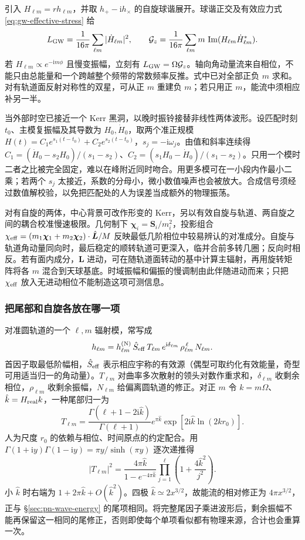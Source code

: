 引入 $H_{\ell m}=r h_{\ell m}$，并取 $h_+-\mathrm i h_\times$ 的自旋球谐展开。球谐正交及有效应力式 \eqref{eq:gw-effective-stress} 给
\begin{equation}
 L_{\rm GW}=\frac{1}{16\pi}\sum_{\ell m}|\dot H_{\ell m}|^2,\qquad
 {\cal G}_z=\frac{1}{16\pi}\sum_{\ell m}m\,
                   \operatorname{Im}(H_{\ell m}\dot H_{\ell m}^*) .
 \label{eq:gw-cmodes}
\end{equation}
若 $H_{\ell m}\propto e^{-\mathrm i m\phi}$ 且慢变振幅，立刻有 $L_{\rm GW}=\Omega{\cal G}_z$。轴向角动量流来自相位，不能只由总能量和一个跨越整个频带的常数频率反推。式中已对全部正负 $m$ 求和。对有轨道面反射对称性的双星，可从正 $m$ 重建负 $m$；若只用正 $m$，能流中须相应补另一半。

当外部时空已接近一个 Kerr 黑洞，以晚时振铃接替非线性两体波形。设匹配时刻 $t_0$、主模复振幅及其导数为 $H_0,\dot H_0$，取两个准正规模 $H(t)=C_1 e^{s_1(t-t_0)}+C_2 e^{s_2(t-t_0)}$，$s_j=-\mathrm i\omega_j$。由值和斜率连续得 $C_1=(\dot H_0-s_2H_0)/(s_1-s_2)$、$C_2=(s_1H_0-\dot H_0)/(s_1-s_2)$。只用一个模时二者之比被完全固定，难以在峰附近同时吻合。用更多模可在一小段内作最小二乘；若两个 $s_j$ 太接近，系数的分母小，微小数值噪声也会被放大。合成信号须经过数值解校验，以免把匹配处的人为误差当成额外的物理振荡。

对有自旋的两体，中心背景可改作形变的 Kerr，另以有效自旋与轨道、两自旋之间的耦合校准慢速极限。几何制下 $\bm\chi_i=\bm S_i/m_i^2$，投影组合 $\chi_{\rm eff}=(m_1\bm\chi_1+m_2\bm\chi_2)\cdot\hat{\bm L}/M$ 反映最低几阶相位中较易辨认的对准成分。自旋与轨道角动量同向时，最后稳定的顺转轨道可更深入，临并合前多转几圈；反向时相反。若有面内成分，$\bm L$ 进动，可在随轨道面转动的基中计算主辐射，再用旋转矩阵将各 $m$ 混合到天球基底。时域振幅和偏振的慢调制由此伴随进动而来；只把 $\chi_{\rm eff}$ 放入无进动相位不能制造这项可测信息。

\subsubsection{把尾部和自旋各放在哪一项}

对准圆轨道的一个 $\ell,m$ 辐射模，常写成
\[
 h_{\ell m}=h_{\ell m}^{({\rm N})}\,\hat S_{\rm eff}\,
                T_{\ell m}\,e^{\mathrm i\delta_{\ell m}}\,
                \rho_{\ell m}^{\,\ell}\,N_{\ell m}.
\]
首因子取最低阶幅相，$\hat S_{\rm eff}$ 表示相应宇称的有效源（偶型可取约化有效能量，奇型可用适当归一的角动量）。$T_{\ell m}$ 对曲率多次散射的领头对数作重求和，$\delta_{\ell m}$ 收剩余相位，$\rho_{\ell m}$ 收剩余振幅，$N_{\ell m}$ 给偏离圆轨道的修正。对正 $m$ 令 $k=m\Omega$、$\hat k=H_{\rm real}k$，一种尾部归一为
\[
 T_{\ell m}=\frac{\Gamma(\ell+1-2\mathrm i\hat k)}{\Gamma(\ell+1)}
       e^{\pi\hat k}\exp[2\mathrm i\hat k\ln(2kr_0)] .
\]
人为尺度 $r_0$ 的依赖与相位、时间原点的约定配合。用 $\Gamma(1+\mathrm i y)\Gamma(1-\mathrm i y)=\pi y/\sinh(\pi y)$ 逐次递推得
\[
 |T_{\ell m}|^2=\frac{4\pi\hat k}{1-e^{-4\pi\hat k}}
                  \prod_{j=1}^\ell\left(1+\frac{4\hat k^2}{j^2}\right).
\]
小 $\hat k$ 时右端为 $1+2\pi\hat k+O(\hat k^2)$。四极 $\hat k\simeq2x^{3/2}$，故能流的相对修正为 $4\pi x^{3/2}$，正与 \S\ref{sec:pn-wave-energy} 的尾项相同。将完整尾因子乘进波形后，剩余振幅不能再保留这一相同的尾修正，否则即使每个单项看似都有物理来源，合计也会重算一次。

